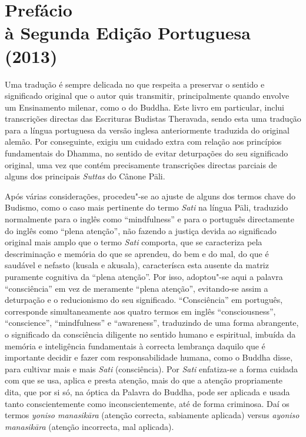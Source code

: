 \chapter[Prefácio à Segunda Edição Portuguesa (2013)]{Prefácio\\ à Segunda Edição Portuguesa\\ (2013)}

Uma tradução é sempre delicada no que respeita a preservar o sentido e
significado original que o autor quis transmitir, principalmente quando envolve
um Ensinamento milenar, como o do Buddha. Este livro em particular, inclui
transcrições directas das Escrituras Budistas Theravada, sendo esta uma tradução
para a língua portuguesa da versão inglesa anteriormente traduzida do original
alemão. Por conseguinte, exigiu um cuidado extra com relação aos princípios
fundamentais do Dhamma, no sentido de evitar deturpações do seu significado
original, uma vez que contém precisamente transcrições directas parciais de
alguns dos principais \emph{Suttas} do Cânone Pāli.

Após várias considerações, procedeu"-se ao ajuste de alguns dos termos chave do
Budismo, como o caso mais pertinente do termo \emph{Sati} na língua Pāli,
traduzido normalmente para o inglês como “mindfulness” e para o português
directamente do inglês como “plena atenção”, não fazendo a justiça devida ao
significado original mais amplo que o termo \emph{Sati} comporta, que se caracteriza
pela descriminação e memória do que se aprendeu, do bem e do mal, do que é saudável e
nefasto (kusala e akusala), caracterísca esta ausente da matriz puramente cognitiva da 
“plena atenção”. Por isso, adoptou"-se aqui a palavra “consciência” em vez de meramente
“plena atenção”, evitando-se assim a deturpação e o reducionismo do seu significado. 
“Consciência” em português, corresponde simultaneamente aos quatro termos em inglês
“consciousness”, “conscience”, “mindfulness” e “awareness”, traduzindo de uma forma 
abrangente, o significado da consciência diligente no sentido humano e espiritual, 
imbuída da memória e inteligência fundamentais à correcta lembrança daquilo que é 
importante decidir e fazer com responsabilidade humana, como o Buddha disse, para
cultivar mais e mais \emph{Sati} (consciência). Por \emph{Sati} enfatiza-se a forma
cuidada com que se usa, aplica e presta atenção, mais do que a atenção propriamente
dita, que por si só, na óptica da Palavra do Buddha, pode ser aplicada e usada tanto 
conscientemente como inconscientemente, até de forma criminosa. Daí os termos 
\emph{yoniso manasikāra} (atenção correcta, sabiamente aplicada) 
versus \emph{ayoniso manasikāra} (atenção incorrecta, mal aplicada).

